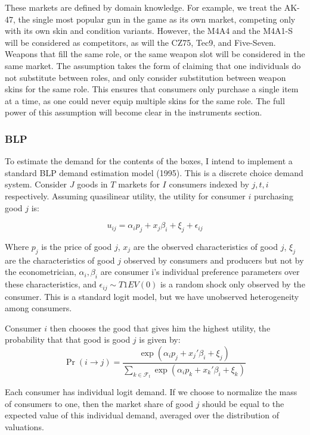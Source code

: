 \documentclass[12pt]{paper}
\begin{document}
These markets are defined by domain knowledge. For example, we treat
the AK-47, the single most popular gun in the game as its own market,
competing only with its own skin and condition variants. However, the
M4A4 and the M4A1-S will be considered as competitors, as will the
CZ75, Tec9, and Five-Seven. Weapons that fill the same role, or the
same weapon slot will be considered in the same market. The assumption
takes the form of claiming that one individuals do not substitute
between roles, and only consider substitution between weapon skins for
the same role. This ensures that consumers only purchase a single item
at a time, as one could never equip multiple skins for the same
role. The full power of this assumption will become clear in the
instruments section.

\subsubsection{BLP}

To estimate the demand for the contents of the boxes, I intend to
implement a standard BLP demand estimation model (1995). This is a discrete
choice demand system. Consider $J$ goods in $T$ markets for $I$
consumers indexed by $j,t,i$ respectively. Assuming quasilinear
utility, the utility for consumer $i$ purchasing good $j$ is:

\begin{equation*}
  u_{ij} = \alpha_i p_j + x_j \beta_i + \xi_j + \epsilon_{ij}
\end{equation*}

Where $p_j$ is the price of good $j$, $x_j$ are the observed
characteristics of good $j$, $\xi_j$ are the characteristics of good
$j$ observed by consumers and producers but not by the econometrician,
$\alpha_i, \beta_i$ are consumer i's individual preference parameters over
these characteristics, and $\epsilon_{ij} \sim T1EV(0)$ is a random shock only
observed by the consumer. This is a standard logit model, but we have
unobserved heterogeneity among consumers.

Consumer $i$ then chooses the good that gives him the highest utility,
the probability that that good is good $j$ is given by:
\begin{equation*}
  \Pr( i \rightarrow j ) = \frac{\exp( \alpha_i p_j + x_j' \beta_i + \xi_j)}{\sum_{k \in
      \mathcal{F}_t} \exp( \alpha_i p_k + x_k' \beta_i + \xi_k)}
\end{equation*}

Each consumer has individual logit demand. If we choose to normalize
the mass of consumers to one, then the market share of good $j$ should
be equal to the expected value of this individual demand, averaged
over the distribution of valuations.
\end{document}
